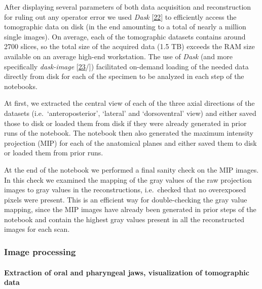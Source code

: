 After displaying several parameters of both data acquisition and reconstruction for ruling out any operator error we used \emph{Dask} {[}\protect\hyperlink{ref-hj1CnyWB}{22}{]} to efficiently access the tomographic data on disk (in the end amounting to a total of nearly a million single images).
On average, each of the tomographic datasets contains around 2700 slices, so the total size of the acquired data (1.5 TB) exceeds the RAM size available on an average high-end workstation.
The use of \emph{Dask} (and more specifically \emph{dask-image} {[}\protect\hyperlink{ref-wIfTDBqd}{23}/{]}) facilitated on-demand loading of the needed data directly from disk for each of the specimen to be analyzed in each step of the notebooks.

At first, we extracted the central view of each of the three axial directions of the datasets (i.e.~`anteroposterior', `lateral' and `dorsoventral' view) and either saved those to disk or loaded them from disk if they were already generated in prior runs of the notebook.
The notebook then also generated the maximum intensity projection (MIP) for each of the anatomical planes and either saved them to disk or loaded them from prior runs.

At the end of the notebook we performed a final sanity check on the MIP images.
In this check we examined the mapping of the gray values of the raw projection images to gray values in the reconstructions, i.e.~checked that no overexposed pixels were present.
This is an efficient way for double-checking the gray value mapping, since the MIP images have already been generated in prior steps of the notebook and contain the highest gray values present in all the reconstructed images for each scan.

\hypertarget{image-processing}{%
\subsubsection{Image processing}\label{image-processing}}

\hypertarget{extraction-of-oral-and-pharyngeal-jaws-visualization-of-tomographic-data}{%
\paragraph{Extraction of oral and pharyngeal jaws, visualization of tomographic data}\label{extraction-of-oral-and-pharyngeal-jaws-visualization-of-tomographic-data}}

